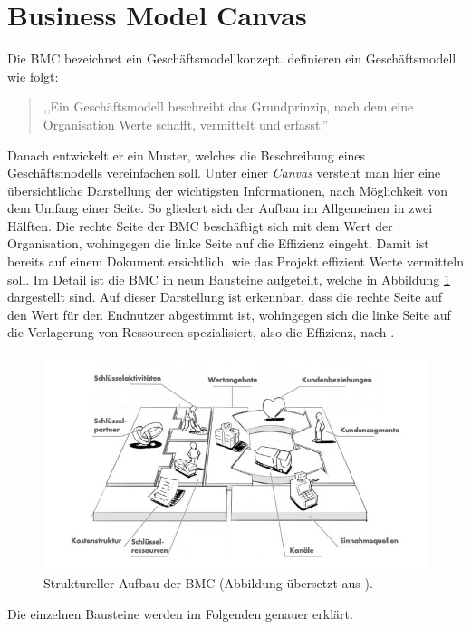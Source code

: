 \section{Business Model Canvas}
\label{BMC_Kapitel}
Die \ac{BMC} bezeichnet ein Geschäftsmodellkonzept.  definieren ein Geschäftsmodell wie folgt:
\begin{quote}
,,Ein Geschäftsmodell beschreibt das Grundprinzip, nach dem eine Organisation Werte schafft, vermittelt und erfasst.''
\end{quote}
Danach entwickelt er ein Muster, welches die Beschreibung eines Geschäftsmodells vereinfachen soll. Unter einer \textit{Canvas} versteht man hier eine übersichtliche Darstellung der wichtigsten Informationen, nach Möglichkeit von dem Umfang einer Seite. So gliedert sich der Aufbau im Allgemeinen in zwei Hälften. Die rechte Seite der \ac{BMC} beschäftigt sich mit dem Wert der Organisation, wohingegen die linke Seite auf die Effizienz eingeht. Damit ist bereits auf einem Dokument ersichtlich, wie das Projekt effizient Werte vermitteln soll. Im Detail ist die \ac{BMC} in neun Bausteine aufgeteilt, welche in Abbildung \ref{fig:BMC_Structure} dargestellt sind. Auf dieser Darstellung ist erkennbar, dass die rechte Seite auf den Wert für den Endnutzer abgestimmt ist, wohingegen sich die linke Seite auf die Verlagerung von Ressourcen spezialisiert, also die Effizienz, nach \citeauthor{BusinessModelGeneration}. 
\begin{figure}
	\begin{center}
		\includegraphics[scale=0.5]{99_IMG/02_Grundlagen/bmcStructure.jpg}
		\caption[Struktureller Aufbau der \ac{BMC}.]{Struktureller Aufbau der \ac{BMC} (Abbildung übersetzt aus ).}
		\label{fig:BMC_Structure}
	\end{center}
\end{figure}
Die einzelnen Bausteine werden im Folgenden genauer erklärt.

